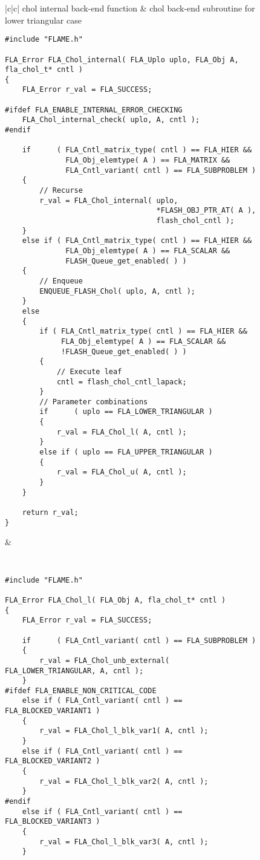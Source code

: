 \begin{figure}[t]
\begin{center}
\begin{tabular}{|c|c|}
\hline
{\sc chol} internal back-end function  & {\sc chol} back-end subroutine for lower triangular case \\ \hline
\begin{minipage}[t]{3in}
{\tiny
\begin{verbatim}
#include "FLAME.h"

FLA_Error FLA_Chol_internal( FLA_Uplo uplo, FLA_Obj A, fla_chol_t* cntl )
{
    FLA_Error r_val = FLA_SUCCESS;
    
#ifdef FLA_ENABLE_INTERNAL_ERROR_CHECKING
    FLA_Chol_internal_check( uplo, A, cntl );
#endif

    if      ( FLA_Cntl_matrix_type( cntl ) == FLA_HIER &&
              FLA_Obj_elemtype( A ) == FLA_MATRIX &&
              FLA_Cntl_variant( cntl ) == FLA_SUBPROBLEM )
    {
        // Recurse
        r_val = FLA_Chol_internal( uplo,
                                   *FLASH_OBJ_PTR_AT( A ),
                                   flash_chol_cntl );
    }
    else if ( FLA_Cntl_matrix_type( cntl ) == FLA_HIER &&
              FLA_Obj_elemtype( A ) == FLA_SCALAR &&
              FLASH_Queue_get_enabled( ) )
    {
        // Enqueue
        ENQUEUE_FLASH_Chol( uplo, A, cntl );
    }
    else
    {
        if ( FLA_Cntl_matrix_type( cntl ) == FLA_HIER &&
             FLA_Obj_elemtype( A ) == FLA_SCALAR &&
             !FLASH_Queue_get_enabled( ) )
        {
            // Execute leaf
            cntl = flash_chol_cntl_lapack;
        }
        // Parameter combinations
        if      ( uplo == FLA_LOWER_TRIANGULAR )
        {
            r_val = FLA_Chol_l( A, cntl );
        }
        else if ( uplo == FLA_UPPER_TRIANGULAR )
        {
            r_val = FLA_Chol_u( A, cntl );
        }
    }

    return r_val;
}
\end{verbatim}
}
\end{minipage}
&
\begin{minipage}[t]{3in}
{\tt \tiny
\begin{verbatim}
#include "FLAME.h"

FLA_Error FLA_Chol_l( FLA_Obj A, fla_chol_t* cntl )
{
    FLA_Error r_val = FLA_SUCCESS;

    if      ( FLA_Cntl_variant( cntl ) == FLA_SUBPROBLEM )
    {
        r_val = FLA_Chol_unb_external( FLA_LOWER_TRIANGULAR, A, cntl );
    }
#ifdef FLA_ENABLE_NON_CRITICAL_CODE
    else if ( FLA_Cntl_variant( cntl ) == FLA_BLOCKED_VARIANT1 )
    {
        r_val = FLA_Chol_l_blk_var1( A, cntl );
    }
    else if ( FLA_Cntl_variant( cntl ) == FLA_BLOCKED_VARIANT2 )
    {
        r_val = FLA_Chol_l_blk_var2( A, cntl );
    }
#endif
    else if ( FLA_Cntl_variant( cntl ) == FLA_BLOCKED_VARIANT3 )
    {
        r_val = FLA_Chol_l_blk_var3( A, cntl );
    }


\end{verbatim}}
\end{minipage}
\end{tabular}
\end{center}
\end{figure}
